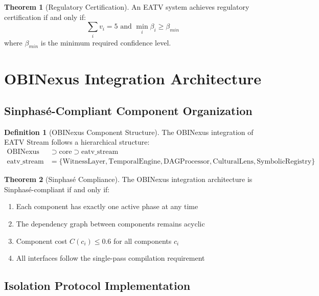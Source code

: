 \documentclass[11pt]{article}
\theoremstyle{definition}
\newtheorem{definition}{Definition}
\newtheorem{theorem}{Theorem}
\begin{document}
\begin{theorem}[Regulatory Certification]
An EATV system achieves regulatory certification if and only if:
\begin{equation}
\sum_{i} v_i = 5 \text{ and } \min_i \beta_i \geq \beta_{min}
\end{equation}
where $\beta_{min}$ is the minimum required confidence level.
\end{theorem}

\section{OBINexus Integration Architecture}

\subsection{Sinphasé-Compliant Component Organization}

\begin{definition}[OBINexus Component Structure]
The OBINexus integration of EATV Stream follows a hierarchical structure:
\begin{align}
\text{OBINexus} &\supset \text{core} \supset \text{eatv\_stream} \\
\text{eatv\_stream} &= \{\text{WitnessLayer}, \text{TemporalEngine}, \text{DAGProcessor}, \text{CulturalLens}, \text{SymbolicRegistry}\}
\end{align}
\end{definition}

\begin{theorem}[Sinphasé Compliance]
The OBINexus integration architecture is Sinphasé-compliant if and only if:
\begin{enumerate}
    \item Each component has exactly one active phase at any time
    \item The dependency graph between components remains acyclic
    \item Component cost $C(c_i) \leq 0.6$ for all components $c_i$
    \item All interfaces follow the single-pass compilation requirement
\end{enumerate}
\end{theorem}

\subsection{Isolation Protocol Implementation}
\end{document}
